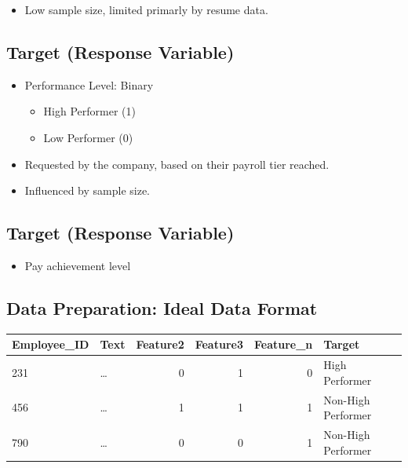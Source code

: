 \documentclass[
]{article}
\providecommand{\tightlist}{%
  \setlength{\itemsep}{0pt}\setlength{\parskip}{0pt}}
\begin{document}
\begin{itemize}
\tightlist
\item
  Low sample size, limited primarly by resume data.
\end{itemize}

\hypertarget{target-response-variable}{%
\subsection{Target (Response Variable)}\label{target-response-variable}}

\begin{itemize}
\tightlist
\item
  Performance Level: Binary

  \begin{itemize}
  \tightlist
  \item
    High Performer (1)
  \item
    Low Performer (0)
  \end{itemize}
\end{itemize}

\begin{itemize}
\tightlist
\item
  Requested by the company, based on their payroll tier reached.
\item
  Influenced by sample size.
\end{itemize}

\hypertarget{target-response-variable-1}{%
\subsection{Target (Response
Variable)}\label{target-response-variable-1}}

\begin{itemize}
\tightlist
\item
  Pay achievement level
\end{itemize}

\hypertarget{data-preparation-ideal-data-format}{%
\subsection{Data Preparation: Ideal Data
Format}\label{data-preparation-ideal-data-format}}

\begin{longtable}[]{@{}llrrrl@{}}
\toprule
Employee\_ID & Text & Feature2 & Feature3 & Feature\_n &
Target\tabularnewline
\midrule
\endhead
231 & \ldots{} & 0 & 1 & 0 & High Performer\tabularnewline
456 & \ldots{} & 1 & 1 & 1 & Non-High Performer\tabularnewline
790 & \ldots{} & 0 & 0 & 1 & Non-High Performer\tabularnewline
\bottomrule
\end{longtable}
\end{document}
